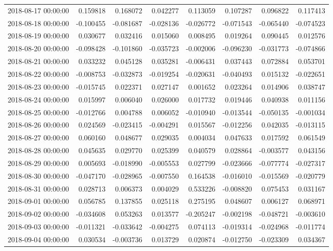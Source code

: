 \begin{tabular}{lrrrrrrr}
2018-08-17 00:00:00 & 0.159818 & 0.168072 & 0.042277 & 0.113059 & 0.107287 & 0.096822 & 0.117413 \\
2018-08-18 00:00:00 & -0.100455 & -0.081687 & -0.028136 & -0.026772 & -0.071543 & -0.065440 & -0.074523 \\
2018-08-19 00:00:00 & 0.030677 & 0.032416 & 0.015060 & 0.008495 & 0.019264 & 0.090445 & 0.012576 \\
2018-08-20 00:00:00 & -0.098428 & -0.101860 & -0.035723 & -0.002006 & -0.096230 & -0.031773 & -0.074866 \\
2018-08-21 00:00:00 & 0.033232 & 0.045128 & 0.035281 & -0.006431 & 0.037443 & 0.072884 & 0.053701 \\
2018-08-22 00:00:00 & -0.008753 & -0.032873 & -0.019254 & -0.020631 & -0.040493 & 0.015132 & -0.022651 \\
2018-08-23 00:00:00 & -0.015745 & 0.022371 & 0.027147 & 0.001652 & 0.023264 & 0.014906 & 0.038747 \\
2018-08-24 00:00:00 & 0.015997 & 0.006040 & 0.026000 & 0.017732 & 0.019446 & 0.040938 & 0.011156 \\
2018-08-25 00:00:00 & -0.012766 & 0.004788 & 0.006052 & -0.010940 & -0.013544 & -0.050135 & -0.001034 \\
2018-08-26 00:00:00 & 0.024569 & -0.023415 & -0.004291 & 0.015567 & -0.012256 & 0.042035 & -0.013115 \\
2018-08-27 00:00:00 & 0.060160 & 0.048677 & 0.029035 & 0.004034 & 0.047633 & 0.017592 & 0.061549 \\
2018-08-28 00:00:00 & 0.045635 & 0.029770 & 0.025399 & 0.040579 & 0.028864 & -0.003577 & 0.043156 \\
2018-08-29 00:00:00 & 0.005693 & -0.018990 & -0.005553 & 0.027799 & -0.023666 & -0.077774 & -0.027317 \\
2018-08-30 00:00:00 & -0.047170 & -0.028965 & -0.007550 & 0.164538 & -0.016010 & -0.015569 & -0.020779 \\
2018-08-31 00:00:00 & 0.028713 & 0.006373 & 0.004029 & 0.533226 & -0.008820 & 0.075453 & 0.031167 \\
2018-09-01 00:00:00 & 0.056785 & 0.137855 & 0.025118 & 0.275195 & 0.048607 & 0.006127 & 0.068971 \\
2018-09-02 00:00:00 & -0.034608 & 0.053263 & 0.013577 & -0.205247 & -0.002198 & -0.048721 & -0.003610 \\
2018-09-03 00:00:00 & -0.011321 & -0.033642 & -0.004275 & 0.074113 & -0.019314 & -0.024968 & -0.011774 \\
2018-09-04 00:00:00 & 0.030534 & -0.003736 & 0.013729 & 0.020874 & -0.012750 & -0.023309 & 0.034367 \\

\end{tabular}
